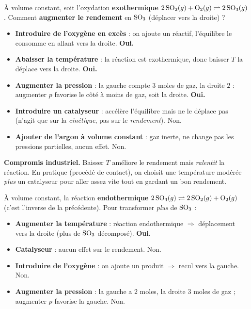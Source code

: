 \documentclass[11pt,a4paper]{article}
\begin{document}
\begin{exemple}
À volume constant, soit l'oxydation \textbf{exothermique} \;$2\,\ce{SO2}(g) + \ce{O2}(g) \rightleftharpoons 2\,\ce{SO3}(g)$.\;
Comment \textbf{augmenter le rendement} en $\ce{SO3}$ (déplacer vers la droite) ?
\begin{itemize}[leftmargin=1.6em,topsep=2pt,itemsep=2pt]
  \item \textbf{Introduire de l'oxygène en excès} : on ajoute un réactif, l'équilibre le consomme en
        allant vers la droite. \textcolor{excol}{\textbf{Oui.}}
  \item \textbf{Abaisser la température} : la réaction est exothermique, donc baisser $T$ la déplace vers
        la droite. \textcolor{excol}{\textbf{Oui.}}
  \item \textbf{Augmenter la pression} : la gauche compte $3$ moles de gaz, la droite $2$ : augmenter $p$
        favorise le côté à moins de gaz, soit la droite. \textcolor{excol}{\textbf{Oui.}}
  \item \textbf{Introduire un catalyseur} : accélère l'équilibre mais ne le déplace pas (n'agit que sur
        la \emph{cinétique}, pas sur le \emph{rendement}). \textcolor{attncol}{Non.}
  \item \textbf{Ajouter de l'argon à volume constant} : gaz inerte, ne change pas les pressions
        partielles, aucun effet. \textcolor{attncol}{Non.}
\end{itemize}
\textbf{Compromis industriel.} Baisser $T$ améliore le rendement mais \emph{ralentit} la réaction. En
pratique (procédé de contact), on choisit une température modérée \emph{plus} un catalyseur pour aller
assez vite tout en gardant un bon rendement.
\end{exemple}

\begin{exemple}
À volume constant, la réaction \textbf{endothermique} \;$2\,\ce{SO3}(g) \rightleftharpoons 2\,\ce{SO2}(g) + \ce{O2}(g)$\;
(c'est l'inverse de la précédente). Pour transformer \emph{plus} de $\ce{SO3}$ :
\begin{itemize}[leftmargin=1.6em,topsep=2pt,itemsep=2pt]
  \item \textbf{Augmenter la température} : réaction endothermique $\Rightarrow$ déplacement vers la
        droite (plus de $\ce{SO3}$ décomposé). \textcolor{excol}{\textbf{Oui.}}
  \item \textbf{Catalyseur} : aucun effet sur le rendement. \textcolor{attncol}{Non.}
  \item \textbf{Introduire de l'oxygène} : on ajoute un produit $\Rightarrow$ recul vers la gauche.
        \textcolor{attncol}{Non.}
  \item \textbf{Augmenter la pression} : la gauche a $2$ moles, la droite $3$ moles de gaz ; augmenter
        $p$ favorise la gauche. \textcolor{attncol}{Non.}
\end{itemize}
\end{exemple}
\end{document}
